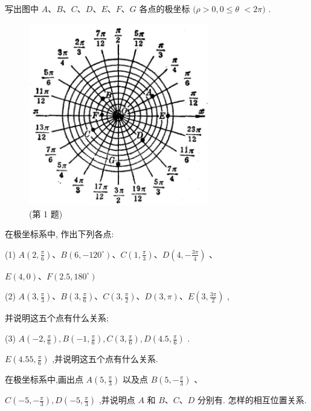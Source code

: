 \documentclass[lang=cn,newtx,10pt,scheme=chinese]{elegantbook}
\begin{document}
\begin{problemset}[练习]

\item 写出图中 \(A\text{、}B\text{、}C\text{、}D\text{、}E\text{、}F\text{、}G\) 各点的极坐标 \((\rho > 0,0 \leq \theta\) \(< {2\pi })\) .

\begin{figure}[h]
  \centering
  \includegraphics[max width=0.7\textwidth]{images/01912cc2-ffb6-728e-9ae7-b113ff05c64b_176_941562.jpg}
  \caption{(第 1 题)}
\end{figure}



\item 在极坐标系中, 作出下列各点:

(1) \(A\left( {2,\frac{\pi }{6}}\right) \text{、}B\left( {6, - {120}^{ \circ }}\right) \text{、}C\left( {1,\frac{\pi }{3}}\right) \text{、}D\left( {4, - \frac{3\pi }{4}}\right)\) 、

\(E\left( {4,0}\right) \text{、}F\left( {{2.5},{180}^{ \circ }}\right)\)

(2) \(A\left( {3,\frac{\pi }{3}}\right) \text{、}B\left( {3,\frac{\pi }{6}}\right) \text{、}C\left( {3,\frac{\pi }{2}}\right) \text{、}D\left( {3,\pi }\right) \text{、}E\left( {3,\frac{3\pi }{2}}\right)\) ,

并说明这五个点有什么关系;

(3) \(A\left( {-2,\frac{\pi }{6}}\right) ,B\left( {-1,\frac{\pi }{6}}\right) ,C\left( {3,\frac{\pi }{6}}\right) ,D\left( {{4.5},\frac{\pi }{6}}\right)\) .

\(E\left( {{4.55},\frac{\pi }{6}}\right)\) ,并说明这五个点有什么关系.

\item 在极坐标系中,画出点 \(A\left( {5,\frac{\pi }{3}}\right)\) 以及点 \(B\left( {5, - \frac{\pi }{3}}\right)\) 、

\(C\left( {-5, - \frac{\pi }{3}}\right) ,D\left( {-5,\frac{\pi }{3}}\right)\) ,并说明点 \(A\) 和 \(B\text{、}C\text{、}D\) 分别有. 怎样的相互位置关系.

\end{problemset}
\end{document}
